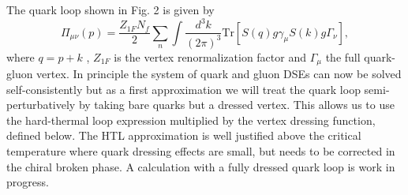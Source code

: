 \documentclass[a4paper,fleqn]{cas-dc}
\begin{document}
The quark loop shown in Fig. 2 is given by
\begin{equation}
	\Pi_{\mu \nu} (p) = \frac{Z_{1F} N_f}{2} \sum_n \int \frac{d^3 k}{(2 \pi)^3}\text{Tr}[S(q) g \gamma_\mu S(k) g \Gamma_\nu],
\end{equation}
where $q = p + k$ , $Z_{1F}$ is the vertex renormalization factor and $\Gamma_\mu$ the full quark-gluon vertex. In principle the system of
quark and gluon DSEs can now be solved self-consistently but as a first approximation we will treat the quark loop semi-
perturbatively by taking bare quarks but a dressed vertex. This allows us to use the hard-thermal loop expression multiplied
by the vertex dressing function, defined below. The HTL approximation is well justified above the critical temperature where
quark dressing effects are small, but needs to be corrected in the chiral broken phase. A calculation with a fully dressed quark
loop is work in progress.
\end{document}
